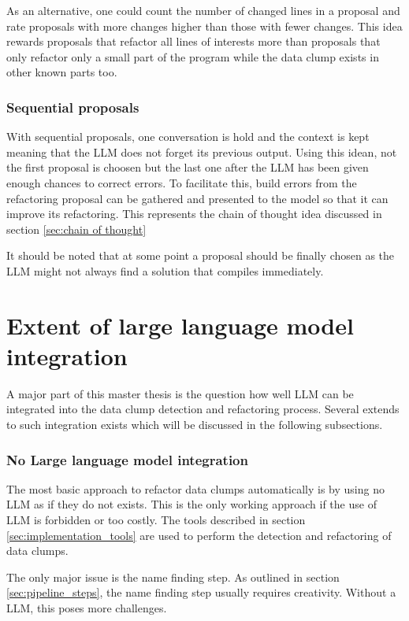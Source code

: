 As an alternative, one could count the number of changed lines in a proposal and rate proposals with more changes higher than those with fewer changes. This idea rewards proposals that refactor all lines of interests more than proposals that only refactor only a small part of the program while the data clump exists in other known parts too. 

\subsubsection{Sequential proposals}

With sequential proposals, one conversation is hold and the context is kept meaning that the \ac{LLM} does not forget its previous output. Using this idean, not the first proposal is choosen but the last one after the \ac{LLM} has been given enough chances to correct errors.  To facilitate this, build errors from the refactoring proposal can be gathered and presented to the model so that it can improve its refactoring. This represents the chain of thought idea discussed in section \ref{sec:chain of thought}

It should be noted that at some point a proposal should be finally chosen as the \ac{LLM} might not always find a solution that compiles immediately. 


\section{Extent of large language model integration}

A major part of this master thesis is the question how well \ac{LLM} can be integrated into the data clump  detection and refactoring process. Several extends to such integration exists which will be discussed in the following subsections. 

\subsubsection{No Large language model integration}

The most basic approach to refactor data clumps automatically is by using no \ac{LLM} as if they do not exists. This is the only working approach if the use of  \ac{LLM} is forbidden or too costly. The tools described in section \ref{sec:implementation_tools} are used to perform the detection and refactoring of data clumps. 

The only major issue is the name finding step. As outlined in section \ref{sec:pipeline_steps}, the name finding step usually requires creativity. Without a \ac{LLM}, this poses more challenges.

